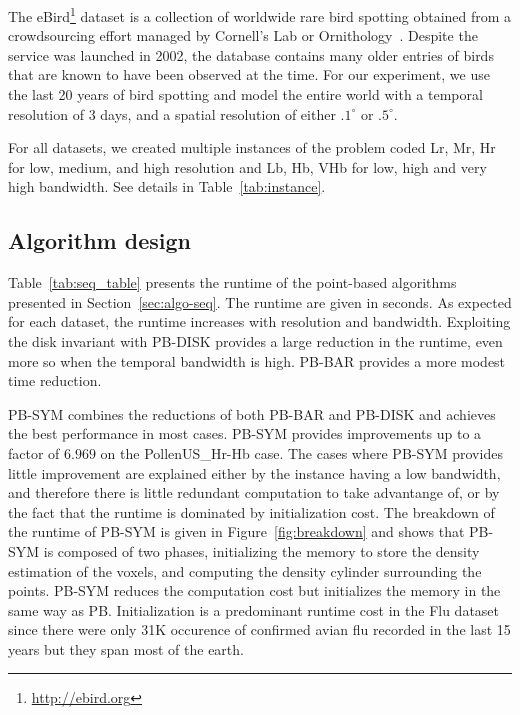 \documentclass{article}
\begin{document}
The eBird\footnote{\url{http://ebird.org}} dataset is a collection of worldwide rare bird spotting
obtained from a crowdsourcing effort managed by Cornell's Lab or
Ornithology~\cite{ebird}. Despite the service was launched in 2002,
the database contains many older entries of birds that are known to
have been observed at the time. For our experiment, we use the last 20
years of bird spotting and model the entire world with a temporal
resolution of 3 days, and a spatial resolution of either $.1^\circ$ or
$.5^\circ$.

For all datasets, we created multiple instances of the problem coded
Lr, Mr, Hr for low, medium, and high resolution and Lb, Hb, VHb for
low, high and very high bandwidth. See details in Table~\ref{tab:instance}. 

\begin{table}
    \resizebox{\linewidth}{!}{}
  \caption{Properties of the datasets. The domain is expressed in voxels
    and in MB. Bandwidth are expressed in voxels.}
  \label{tab:instance}
\end{table}

\subsection{Algorithm design}


\begin{table}
  \resizebox{\linewidth}{!}{}
  \caption{Runtime of different algorithm. The speedup of PB-SYM over PB is given.  }
  \label{tab:seq_table}
\end{table}

Table~\ref{tab:seq_table} presents the runtime of the point-based
algorithms presented in Section~\ref{sec:algo-seq}. The runtime are
given in seconds. As expected for each dataset, the runtime increases
with resolution and bandwidth. Exploiting the disk invariant with
PB-DISK provides a large reduction in the runtime, even more so when
the temporal bandwidth is high. PB-BAR provides a more modest time
reduction.

PB-SYM combines the reductions of both PB-BAR and PB-DISK and achieves
the best performance in most cases. PB-SYM provides improvements up to
a factor of $6.969$ on the PollenUS\_Hr-Hb case. The cases where PB-SYM
provides little improvement are explained either by the instance having a
low bandwidth, and therefore there is little redundant computation to
take advantange of, or by the fact that the runtime is dominated by
initialization cost. The breakdown of the runtime of PB-SYM is given
in Figure~\ref{fig:breakdown} and shows that PB-SYM is composed of two
phases, initializing the memory to store the density estimation of the
voxels, and computing the density cylinder surrounding the
points. PB-SYM reduces the computation cost but initializes the memory
in the same way as PB. Initialization is a predominant runtime cost in
the Flu dataset since there were only 31K occurence of confirmed avian
flu recorded in the last 15 years but they span most of the earth.
\end{document}
